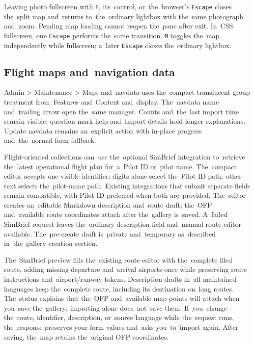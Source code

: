 \documentclass[11pt,a4paper]{article}
\newcommand{\codeword}[1]{\nolinkurl{#1}}
\begin{document}
Leaving photo fullscreen with \codeword{F}, its~control, or~the~browser's
\codeword{Escape} closes the~split map and~returns to~the~ordinary lightbox
with the~same photograph and~zoom. Pending map loading cannot reopen the~pane
after exit. In~CSS fullscreen, one \codeword{Escape} performs the~same
transition. \codeword{M} toggles the~map independently while fullscreen;
a~later \codeword{Escape} closes the~ordinary lightbox.

\subsection{Flight maps and~navigation data}

Admin > Maintenance > Maps and~navdata uses the~compact translucent group
treatment from~Features and~Content and~display. The~navdata name and~trailing
arrow open the~same manager. Counts and~the~last import time remain visible;
question-mark help and~Import details hold longer explanations. Update navdata
remains an~explicit action with in-place progress and~the~normal form fallback.

Flight-oriented collections can~use the~optional SimBrief integration
to~retrieve the~latest operational flight plan for~a~Pilot ID or~pilot name.
The~compact editor accepts one visible identifier: digits alone select the~Pilot
ID path; other text selects the~pilot-name path. Existing integrations that
submit separate fields remain compatible, with Pilot ID preferred when both
are~provided. The~editor creates an~editable Markdown description and~route
draft; the~OFP and~available route coordinates attach after the~gallery
is~saved. A~failed SimBrief request leaves the~ordinary description field
and~manual route editor available. The~pre-create draft is~private and~temporary
as~described in~the~gallery creation section.

The~SimBrief preview fills the~existing route editor with the~complete filed
route, adding missing departure and~arrival airports once while preserving route
instructions and~airport/runway tokens. Description drafts in~all maintained
languages keep the~complete route, including its destination on~long routes.
The~status explains that the~OFP and~available map points will attach when
you~save the~gallery; importing alone does~not~save them. If~you~change
the~route, identifier, description, or~source language while the~request runs,
the~response preserves your form values and~asks you~to~import again. After
saving, the~map retains the~original OFP coordinates.
\end{document}
